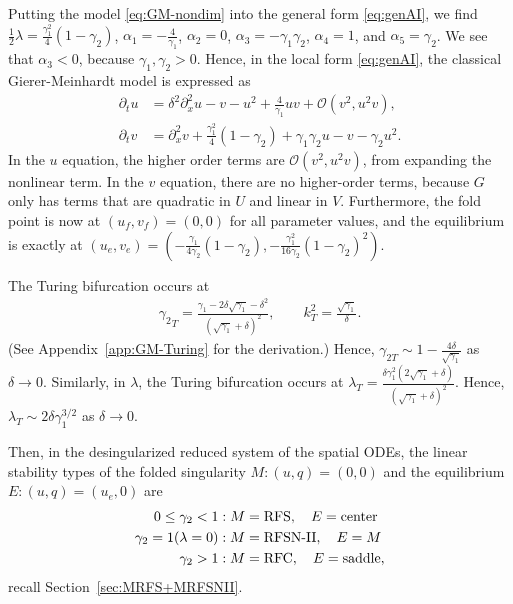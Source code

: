 \documentclass[11pt]{article}
\numberwithin{equation}{section}
\begin{document}
Putting the model \eqref{eq:GM-nondim} into the general form \eqref{eq:genAI}, we find
$\frac{1}{2}\lambda = \frac{\gamma_1^2}{4}(1-\gamma_2)$,
$\alpha_1 = -\frac{4}{\gamma_1}$,
$\alpha_2=0$,
$\alpha_3 = -\gamma_1 \gamma_2$,
$\alpha_4=1$, 
and $\alpha_5=\gamma_2$.
We see that $\alpha_3<0$, because $\gamma_1, \gamma_2>0$.
Hence, in the local form \eqref{eq:genAI}, the classical Gierer-Meinhardt model is expressed as
\begin{equation}
    \begin{split}
       \partial_t u &= \delta^2 \partial_x^2 u - v - u^2 + \frac{4}{\gamma_1}uv + \mathcal{O}(v^2,u^2 v), \\
       \partial_t v &= \partial_x^2 v + \frac{\gamma_1^2}{4}(1-\gamma_2) + \gamma_1\gamma_2 u - v - \gamma_2 u^2.
    \end{split}
\end{equation}
In the $u$ equation, the higher order terms are $\mathcal{O}(v^2,u^2v)$, from expanding the nonlinear term.
In the $v$ equation, there are no higher-order terms, because $G$ only has terms that are quadratic in $U$ and linear in $V$.
Furthermore, the fold point is now at $(u_f,v_f)=(0,0)$ for all parameter values,
and the equilibrium is exactly at $(u_e,v_e)=\left(-\frac{\gamma_1}{4\gamma_2}(1 - \gamma_2),-\frac{\gamma_1^2}{16\gamma_2}(1-\gamma_2)^2\right)$.

The Turing bifurcation occurs at 
\begin{equation} \label{eq:gamma_2T-GM}
\begin{split} 
{\gamma_2}_T = \frac{\gamma_1 - 2\delta \sqrt{\gamma_1} - \delta^2}{(\sqrt{\gamma_1}+\delta)^2}, \qquad 
k_T^2 = \frac{\sqrt{\gamma_1}}{\delta}.
\end{split}
\end{equation}
(See Appendix~\ref{app:GM-Turing} for the derivation.)
Hence, $\gamma_{2T} \sim 1 - \frac{4\delta}{\sqrt{\gamma_1}}$ as $\delta \to 0$.
Similarly, in $\lambda$,
the Turing bifurcation occurs at 
$\lambda_T= \frac{\delta \gamma_1^2 (2\sqrt{\gamma_1}+\delta)}{(\sqrt{\gamma_1} + \delta)^2}$.
Hence, $\lambda_T \sim 2 \delta \gamma_1^{3/2}$ as $\delta \to 0$.

Then, in the desingularized reduced system of the spatial ODEs, the linear stability types of the folded singularity $M: (u,q)=(0,0)$ and the equilibrium $E: (u,q)=(u_e,0)$ are
\begin{equation}\label{eq:GM-classifyM}
    \begin{split}
      0 \le \gamma_2<1 &: M = {\rm RFS}, \quad E = {\rm center} \\
      \gamma_2 = 1 (\lambda=0) &: M = \text{RFSN-II}, \quad E = M \\
      \gamma_2>1 &: M = {\rm RFC}, \quad E = {\rm saddle},
  \end{split}
\end{equation}
recall Section~\ref{sec:MRFS+MRFSNII}.
\end{document}

